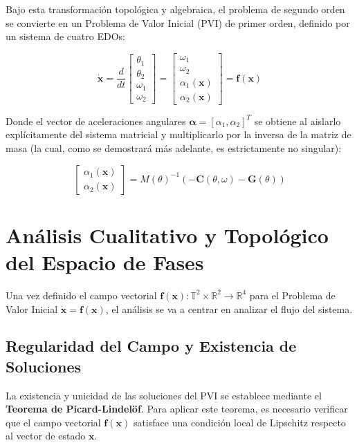 \documentclass[13pt]{extarticle}
\begin{document}
Bajo esta transformación topológica y algebraica, el problema de segundo orden se convierte en un Problema de Valor Inicial (PVI) de primer orden, definido por un sistema de cuatro EDOs:

\begin{equation}
\dot{\mathbf{x}} = \frac{d}{dt} \begin{bmatrix} \theta_1 \\ \theta_2 \\ \omega_1 \\ \omega_2 \end{bmatrix} = \begin{bmatrix} \omega_1 \\ \omega_2 \\ \alpha_1(\mathbf{x}) \\ \alpha_2(\mathbf{x}) \end{bmatrix} = \mathbf{f}(\mathbf{x})
\end{equation}

Donde el vector de aceleraciones angulares $\boldsymbol{\alpha} = [\alpha_1, \alpha_2]^T$ se obtiene al aislarlo explícitamente del sistema matricial y multiplicarlo por la inversa de la matriz de masa (la cual, como se demostrará más adelante, es estrictamente no singular):

\begin{equation}
\begin{bmatrix} \alpha_1(\mathbf{x}) \\ \alpha_2(\mathbf{x}) \end{bmatrix} = M(\theta)^{-1} \left( -\mathbf{C}(\theta, \omega) - \mathbf{G}(\theta) \right)
\end{equation}

\section{Análisis Cualitativo y Topológico del Espacio de Fases}

Una vez definido el campo vectorial $\mathbf{f}(\mathbf{x}): \mathbb{T}^2 \times \mathbb{R}^2 \to \mathbb{R}^4$ para el Problema de Valor Inicial $\dot{\mathbf{x}} = \mathbf{f}(\mathbf{x})$, el análisis se va a centrar en analizar el flujo del sistema.

\subsection{Regularidad del Campo y Existencia de Soluciones}

La existencia y unicidad de las soluciones del PVI se establece mediante el \textbf{Teorema de Picard-Lindelöf}. Para aplicar este teorema, es necesario verificar que el campo vectorial $\mathbf{f}(\mathbf{x})$ satisface una condición local de Lipschitz respecto al vector de estado $\mathbf{x}$.
\end{document}
